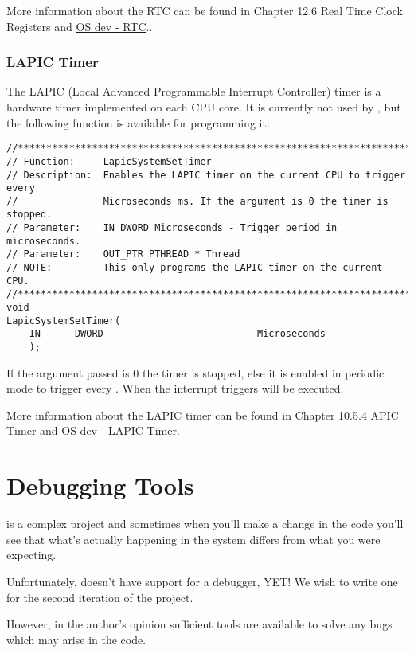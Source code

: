 \begin{appendices}
More information about the RTC can be found in \cite{intelPch} Chapter 12.6 Real Time Clock Registers and 
\href{http://wiki.osdev.org/RTC}{OS dev - RTC}..

\subsection{LAPIC Timer}

The LAPIC (Local Advanced Programmable Interrupt Controller) timer is a hardware timer implemented on each CPU core.
It is currently not used by \projectname, but the following function is available for programming it:
\begin{lstlisting}[caption={LAPIC Timer},label={lst:LapicTimer}]
//******************************************************************************
// Function:     LapicSystemSetTimer
// Description:  Enables the LAPIC timer on the current CPU to trigger every
//               Microseconds ms. If the argument is 0 the timer is stopped.
// Parameter:    IN DWORD Microseconds - Trigger period in microseconds.
// Parameter:    OUT_PTR PTHREAD * Thread
// NOTE:         This only programs the LAPIC timer on the current CPU.
//******************************************************************************
void
LapicSystemSetTimer(
    IN      DWORD                           Microseconds
    );
\end{lstlisting}

If the argument passed is 0 the timer is stopped, else it is enabled in periodic mode to trigger every .
When the interrupt triggers  will be executed.

More information about the LAPIC timer can be found in \cite{intelSys} Chapter 10.5.4 APIC Timer and
\href{http://wiki.osdev.org/APIC_timer}{OS dev - LAPIC Timer}.

\chapter{Debugging Tools}
\label{chap:Debugging}

\projectname is a complex project and sometimes when you'll make a change in the code you'll see
that what's actually happening in the system differs from what you were expecting.

Unfortunately, \projectname doesn't have support for a debugger, YET! We wish to write one for the
second iteration of the project.

However, in the author's opinion sufficient tools are available to solve any bugs which may arise
in the code.


\end{appendices}
